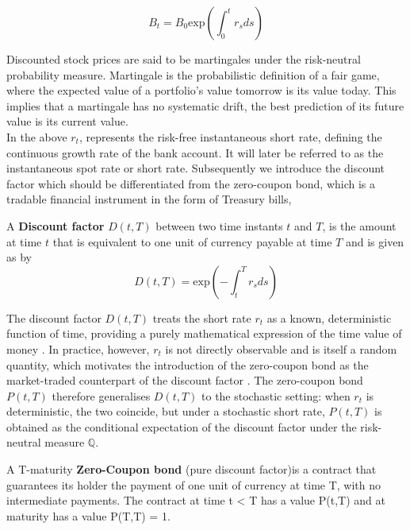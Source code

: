     \begin{equation}
        B_t = B_0\text{exp}  \left( \int_{0}^{t} r_s ds\right)
    \end{equation}

    \noindent
    Discounted stock prices are said to be martingales under the risk-neutral probability measure. Martingale is the probabilistic definition of a fair game, where the expected value of a portfolio’s value tomorrow is its value today. This implies that a martingale has no systematic drift, the best prediction of its future value is its current value. \\ 

    \noindent
    In the above $r_t$, represents the risk-free instantaneous short rate, defining the continuous growth rate of the bank account. It will later be referred to as the instantaneous spot rate or short rate. Subsequently we introduce the discount factor which should be differentiated from the zero-coupon bond, which is a tradable financial instrument in the form of Treasury bills,\\

    \begin{definition} \label{def:discount_factor}  
    A \textbf{Discount factor} $D(t,T)$ between two time instants $t$ and $T$, is the amount at time $t$ that is equivalent to one unit of currency payable at time $T$ and is given as by
        \begin{equation}
            D(t,T) = \text{exp}\left( - \int_{t}^{T} r_s ds\right)
        \end{equation}
    \end{definition}
    
    \noindent 
    The discount factor $D(t,T)$ treats the short rate $r_t$ as a known, deterministic function of time, providing a purely mathematical expression of the time value of money \cite{brigo2001interest}. In practice, however, $r_t$ is not directly observable and is itself a random quantity, which motivates the introduction of the zero-coupon bond as the market-traded counterpart of the discount factor \cite{shreve2004stochastic}. The zero-coupon bond $P(t,T)$ therefore generalises $D(t,T)$ to the stochastic setting: when $r_t$ is deterministic, the two coincide, but under a stochastic short rate, $P(t,T)$ is obtained as the conditional expectation of the discount factor under the risk-neutral measure $\mathbb{Q}$.
    
    \noindent
    
    \begin{definition} \label{def:zcb} 
    A T-maturity \textbf{Zero-Coupon bond} (pure discount factor)is a contract that guarantees its holder the payment of one unit of currency at time T, with no intermediate payments. The contract at time t < T has a value P(t,T) and at maturity has a value  P(T,T) = 1. 
        
    \end{definition}
    
